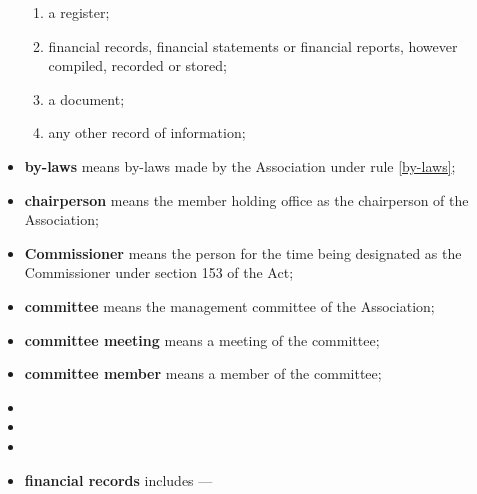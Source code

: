 \documentclass[../constitution.tex]{subfiles}
\begin{document}
\begin{itemize}[label={-}]
\begin{enumerate}
  \item a register;
  \item financial records, financial statements or financial reports, however compiled, recorded or stored;
  \item a document;
  \item any other record of information;
  \end{enumerate}
\item \textbf{by-laws} means by-laws made by the Association under rule \ref{by-laws};
\item \textbf{chairperson} means the  member holding office as the chairperson of the Association;
\item \textbf{Commissioner} means the person for the time being designated as the Commissioner under section 153 of the Act;
\item \textbf{committee} means the management committee of the Association;
\item \textbf{committee meeting} means a meeting of the committee;
\item \textbf{committee member} means a member of the committee;
\item {}
\item {}
\item {} 
\item \textbf{financial records} includes ---

  \begin{enumerate}
    \def\labelenumi{\alph{enumi})}
    \setcounter{enumi}{0}
  

\end{enumerate}
\end{itemize}
\end{document}

